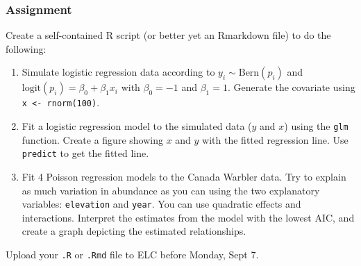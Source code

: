\documentclass[color=usenames,dvipsnames]{beamer}\usepackage[]{graphicx}\usepackage[]{color}
\newcommand{\inr}[1]{\colorbox{inlinecolor}{\texttt{#1}}}
\begin{document}





\begin{frame}
  \frametitle{Assignment}
  \small
  Create a self-contained R script (or better yet an Rmarkdown file)
  to do the following:
  \begin{enumerate}
    \small
    \item Simulate logistic regression data according to
      $y_i \sim \mathrm{Bern}(p_i)$ and $\mathrm{logit}(p_i) = \beta_0
      + \beta_1 x_i$ with $\beta_0=-1$ and $\beta_1=1$. Generate the
      covariate using \inr{x <- rnorm(100)}.
    \item Fit a logistic regression model to the simulated data ($y$
      and $x$) using the \inr{glm} function. Create a figure showing
      $x$ and $y$ with the fitted regression line. Use
      \inr{predict} to get the fitted line.
    \item Fit 4 Poisson regression models to the Canada Warbler
      data. Try to explain as much variation in abundance as you can
      using the two explanatory variables: {\tt elevation} and
      {\tt year}. You can use quadratic effects and
      interactions. Interpret the estimates from the model with the 
      lowest AIC, and create a graph depicting the estimated
      relationships. 
  \end{enumerate}
  Upload your {\tt .R} or {\tt .Rmd} file to ELC before Monday, Sept 7. 
\end{frame}
\end{document}
